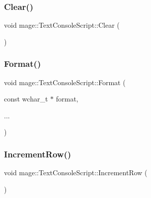 \subsubsection{\texorpdfstring{Clear()}{Clear()}}
{\footnotesize\ttfamily void mage\+::\+Text\+Console\+Script\+::\+Clear (\begin{DoxyParamCaption}{ }\end{DoxyParamCaption})}

\hypertarget{classmage_1_1_text_console_script_a4d9ba97e4ff4ad5390b20e5523a20e92}{}\label{classmage_1_1_text_console_script_a4d9ba97e4ff4ad5390b20e5523a20e92} 
\subsubsection{\texorpdfstring{Format()}{Format()}}
{\footnotesize\ttfamily void mage\+::\+Text\+Console\+Script\+::\+Format (\begin{DoxyParamCaption}\item[{const wchar\+\_\+t $\ast$}]{format,  }\item[{}]{... }\end{DoxyParamCaption})}

\hypertarget{classmage_1_1_text_console_script_a0e82c5d5b84499bf4ed2233cf26145fa}{}\label{classmage_1_1_text_console_script_a0e82c5d5b84499bf4ed2233cf26145fa} 
\subsubsection{\texorpdfstring{Increment\+Row()}{IncrementRow()}}
{\footnotesize\ttfamily void mage\+::\+Text\+Console\+Script\+::\+Increment\+Row (\begin{DoxyParamCaption}{ }\end{DoxyParamCaption})\hspace{0.3cm}{\ttfamily [private]}}

\hypertarget{classmage_1_1_text_console_script_af7da3f0735f72fed0d6fc265b6ae07e9}{}\label{classmage_1_1_text_console_script_af7da3f0735f72fed0d6fc265b6ae07e9} 
